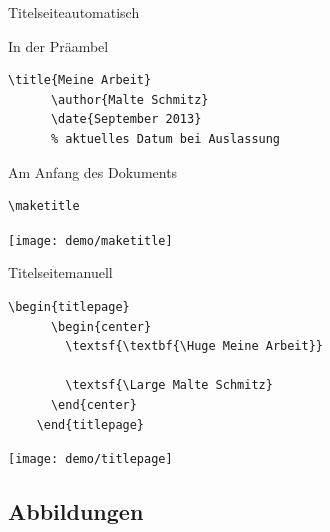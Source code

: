 \begin{Frame}[t,fragile]{Titelseite}{automatisch}
  \begin{Block}{In der Präambel}
    \begin{lstlisting}[gobble=6,style=block]
      \title{Meine Arbeit}
      \author{Malte Schmitz}
      \date{September 2013}
      % aktuelles Datum bei Auslassung
    \end{lstlisting}
  \end{Block}

  \begin{Block}{Am Anfang des Dokuments}
    \begin{lstlisting}[gobble=6,style=block]
      \maketitle
    \end{lstlisting}
  \end{Block}

  \centerline{\texttt{[image: demo/maketitle]}}
\end{Frame}

\begin{Frame}[fragile]{Titelseite}{manuell}
  \begin{lstlisting}[gobble=4]
    \begin{titlepage}
      \begin{center}
        \textsf{\textbf{\Huge Meine Arbeit}}

        \textsf{\Large Malte Schmitz}
      \end{center}
    \end{titlepage}
  \end{lstlisting}

  \centerline{\texttt{[image: demo/titlepage]}}
\end{Frame}

\subsection{Abbildungen}

